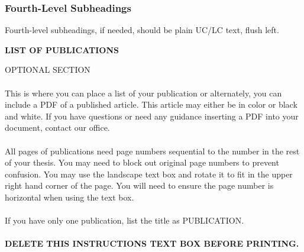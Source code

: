 \documentclass{article}
\begin{document}
\begin{justify}
\begin{appendix}
\subsubsection{Fourth-Level Subheadings}
Fourth-level subheadings, if needed, should be plain UC/LC text, flush left. 
\end{appendix} 
\newpage
{}
\begin{center}
\textbf {LIST OF PUBLICATIONS}
\end{center}
\begin{tcolorbox}[enhanced jigsaw,
    sharp corners,
    boxrule=0.5pt, 
    colback=blue!30!white,   
    borderline={0.5pt}{-2pt}{black,solid} %
 ]
 \begin{justify}
OPTIONAL SECTION\\~\\
This is where you can place a list of your publication or alternately, you can include a PDF of a published article. This article may either be in color or black and white. If you have questions or need any guidance inserting a PDF into your document, contact our office.\\~\\
All pages of publications need page numbers sequential to the number in the rest of your thesis. You may need to block out original page numbers to prevent confusion. You may use the landscape text box and rotate it to fit in the upper right hand corner of the page. You will need to ensure the page number is horizontal when using the text box.\\~\\
If you have only one publication, list the title as PUBLICATION.\\~\\
\bf{DELETE THIS INSTRUCTIONS TEXT BOX BEFORE PRINTING.}
\end{justify}
\end{tcolorbox}
\end{justify}
\end{document}
